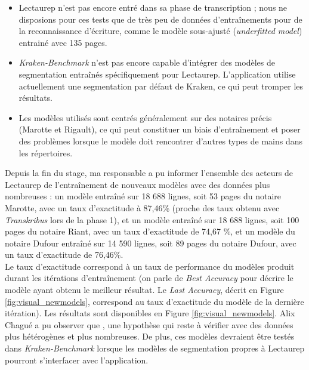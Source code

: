 \begin{itemize}
    \item Lectaurep n'est pas encore entré dans sa phase de transcription ; nous ne disposions pour ces tests que de très peu de données d'entraînements pour de la reconnaissance d'écriture, comme le modèle sous-ajusté (\textit{underfitted model})  entrainé avec 135 pages.
    \item \textit{Kraken-Benchmark} n'est pas encore capable d'intégrer des modèles de segmentation entraînés spécifiquement pour Lectaurep. L'application utilise actuellement une segmentation par défaut de Kraken, ce qui peut tromper les résultats.
    \item Les modèles utilisés sont centrés généralement sur des notaires précis (Marotte et Rigault), ce qui peut constituer un biais d'entraînement et poser des problèmes lorsque le modèle doit rencontrer d'autres types de mains dans les répertoires.
\end{itemize}
\newpage
Depuis la fin du stage, ma responsable a pu informer l'ensemble des acteurs de Lectaurep de l'entraînement de nouveaux modèles  avec des données plus nombreuses : un modèle entraîné sur 18 688 lignes, soit 53 pages du notaire Marotte, avec un taux d'exactitude à 87,46\% (proche des taux obtenu avec \textit{Transkribus} lors de la phase 1), et un modèle entraîné sur 18 688 lignes, soit 100 pages du notaire Riant, avec un taux d'exactitude de 74,67 \%, et un modèle du notaire Dufour entraîné sur 14 590 lignes, soit 89 pages du notaire Dufour, avec un taux d'exactitude de 76,46\%. \\ 

Le taux d'exactitude correspond à un taux de performance du modèles produit durant les itérations d'entraînement (on parle de \textit{Best Accuracy} pour décrire le modèle ayant obtenu le meilleur résultat. Le \textit{Last Accuracy}, décrit en Figure \ref{fig:visual_newmodels}, correspond au taux d'exactitude du modèle de la dernière itération). Les résultats sont disponibles en Figure \ref{fig:visual_newmodels}. Alix Chagué a pu observer que , une hypothèse qui reste à vérifier avec des données plus hétérogènes et plus nombreuses. De plus, ces modèles devraient être testés dans \textit{Kraken-Benchmark} lorsque les modèles de segmentation propres à Lectaurep pourront s'interfacer avec l'application.\\

